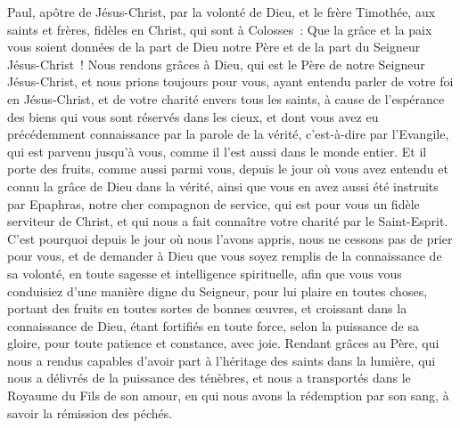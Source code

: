 \begin{multicols}{2}
\VerseOne{}Paul, apôtre de Jésus-Christ, par la volonté de Dieu, et le frère Timothée,
aux saints et frères, fidèles en Christ, qui sont à Colosses~: Que la grâce et la paix vous soient données de la part de Dieu notre Père et de la part du Seigneur Jésus-Christ~!
Nous rendons grâces à Dieu, qui est le Père de notre Seigneur Jésus-Christ, et nous prions toujours pour vous,
ayant entendu parler de votre foi en Jésus-Christ, et de votre charité envers tous les saints,
à cause de l'espérance des biens qui vous sont réservés dans les cieux, et dont vous avez eu précédemment connaissance par la parole de la vérité, c'est-à-dire par l'Evangile,
qui est parvenu jusqu'à vous, comme il l'est aussi dans le monde entier. Et il porte des fruits, comme aussi parmi vous, depuis le jour où vous avez entendu et connu la grâce de Dieu dans la vérité,
ainsi que vous en avez aussi été instruits par Epaphras, notre cher compagnon de service, qui est pour vous un fidèle serviteur de Christ,
et qui nous a fait connaître votre charité par le Saint-Esprit.
C'est pourquoi depuis le jour où nous l'avons appris, nous ne cessons pas de prier pour vous, et de demander à Dieu que vous soyez remplis de la connaissance de sa volonté, en toute sagesse et intelligence spirituelle,
afin que vous vous conduisiez d'une manière digne du Seigneur, pour lui plaire en toutes choses, portant des fruits en toutes sortes de bonnes œuvres, et croissant dans la connaissance de Dieu,
étant fortifiés en toute force, selon la puissance de sa gloire, pour toute patience et constance, avec joie.
Rendant grâces au Père, qui nous a rendus capables d'avoir part à l'héritage des saints dans la lumière,
qui nous a délivrés de la puissance des ténèbres, et nous a transportés dans le Royaume du Fils de son amour,
en qui nous avons la rédemption par son sang, à savoir la rémission des péchés.

\end{multicols}
